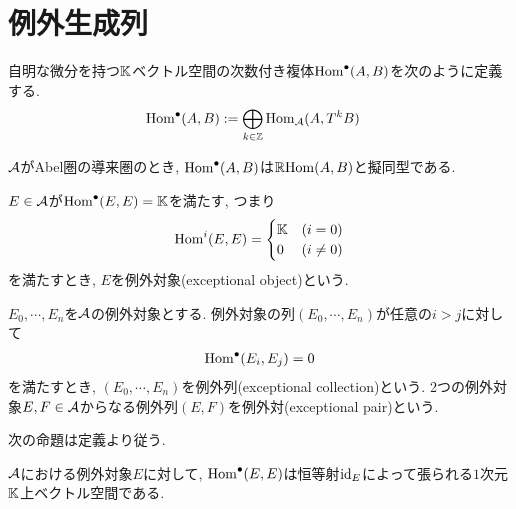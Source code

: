 \documentclass[uplatex, a4paper, 14Q, dvipdfmx]{jsarticle}
\begin{document}
\section{例外生成列} 

自明な微分を持つ$\mathbb{K}$ベクトル空間の次数付き複体$\mathrm{Hom}^\bullet(A,B)$を次のように定義する. 
\begin{align*}
  \mathrm{Hom}^\bullet(A,B) &:= \bigoplus_{k \in \mathbb{Z}} \mathrm{Hom}_{\mathcal{A}}(A,T^kB)
\end{align*}

\begin{example}
  $\mathcal{A}$がAbel圏の導来圏のとき, $\mathrm{Hom}^\bullet(A,B)$は$\mathbb{R}\mathrm{Hom}(A,B)$と擬同型である. 
\end{example}

\begin{definition}[例外対象]
  $E \in \mathcal{A}$が$\mathrm{Hom}^\bullet(E,E) = \mathbb{K}$を満たす, つまり
  \begin{align*}
    \mathrm{Hom}^i(E,E) = 
    \begin{cases}
      \mathbb{K} & (i = 0) \\
      0    & (i \neq 0) 
    \end{cases}
  \end{align*}
  を満たすとき, $E$を例外対象(exceptional object)という. 
\end{definition}

\begin{definition}[例外列]
  $E_0,\cdots,E_n$を$\mathcal{A}$の例外対象とする. 
  例外対象の列$(E_0,\cdots,E_n)$が任意の$i>j$に対して
  \begin{align*}
    \mathrm{Hom}^\bullet(E_i,E_j) = 0
  \end{align*}
  を満たすとき, $(E_0,\cdots,E_n)$を例外列(exceptional collection)という.
  2つの例外対象$E,F \in \mathcal{A}$からなる例外列$(E,F)$を例外対(exceptional pair)という.  
\end{definition}


次の命題は定義より従う. 

\begin{lemma}
  $\mathcal{A}$における例外対象$E$に対して, $\mathrm{Hom}^\bullet(E,E)$は恒等射$\mathrm{id}_E$によって張られる$1$次元$\mathbb{K}$上ベクトル空間である. 
\end{lemma}
\end{document}
